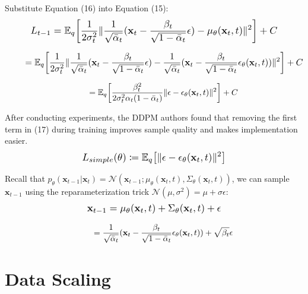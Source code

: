 \documentclass{article}
\newcommand*{\Scale}[2][4]{\scalebox{#1}{\ensuremath{#2}}}
\begin{document}
Substitute Equation (16) into Equation (15):
\begin{equation}
\Scale[1.2]{ \displaystyle
L_{t-1} = \mathbb{E}_{q} \left[ 
\frac{1}{2\sigma_t^2}
\norm{
\frac{1}{\sqrt{\bar{\alpha}_t}} ( \textbf{x}_t - \frac{\beta_t}{\sqrt{1-\bar{\alpha}_t}} \epsilon)
-
\mu_\theta(\textbf{x}_t,t)
}^2
\right] + C }
\end{equation}

\begin{equation}
\Scale[1.2]{ \displaystyle
\hspace{2.25em} = \mathbb{E}_{q} \left[ 
\frac{1}{2\sigma_t^2}
\norm{
\frac{1}{\sqrt{\bar{\alpha}_t}} ( \textbf{x}_t - \frac{\beta_t}{\sqrt{1-\bar{\alpha}_t}} \epsilon)
-
\frac{1}{\sqrt{\bar{\alpha}_t}} ( \textbf{x}_t - \frac{\beta_t}{\sqrt{1-\bar{\alpha}_t}} \epsilon_\theta(\textbf{x}_t, t))
}^2
\right] + C }
\end{equation}

\begin{fleqn}[\parindent]
\begin{equation}
\begin{split}
\hspace{2.25em} = \mathbb{E}_{q} \left[ 
\frac{\beta_t^2}{2\sigma_t^2\alpha_t(1-\bar{\alpha}_t)}
\norm{
\epsilon
-
\epsilon_\theta(\textbf{x}_t, t)
}^2
\right] + C
\end{split}
\end{equation}
\end{fleqn}

After conducting experiments, the DDPM authors found that removing the first term in (17) during training improves sample quality and makes implementation easier.
\begin{equation}
\Scale[1.2]{ \displaystyle
L_{simple}(\theta) \coloneq \mathbb{E}_{q} \left[ 
\norm{
\epsilon
-
\epsilon_\theta(\textbf{x}_t, t)
}^2
\right] }
\end{equation}

Recall that $ p_\theta(\textbf{x}_{t-1}|\textbf{x}_{t}) = \mathscr{N}(\textbf{x}_{t-1};\mu_\theta(\textbf{x}_{t},t),\Sigma_\theta(\textbf{x}_t, t)) $, we can sample $ \textbf{x}_{t-1} $ using the reparameterization trick $ \mathscr{N}(\mu,\sigma^2) = \mu + \sigma \epsilon $:
\begin{equation}
\Scale[1.2]{ \displaystyle
\textbf{x}_{t-1} = \mu_\theta(\textbf{x}_{t},t) + \Sigma_\theta(\textbf{x}_{t},t) + \epsilon }
\end{equation}

\begin{fleqn}[\parindent]
\begin{equation}
\begin{split}
\hspace{2.25em} = \frac{1}{\sqrt{\bar{\alpha}_t}} ( \textbf{x}_t - \frac{\beta_t}{\sqrt{1-\bar{\alpha}_t}} \epsilon_\theta(\textbf{x}_t, t)) + \sqrt{\beta_t} \epsilon
\end{split}
\end{equation}
\end{fleqn}


\section{Data Scaling}
\end{document}
